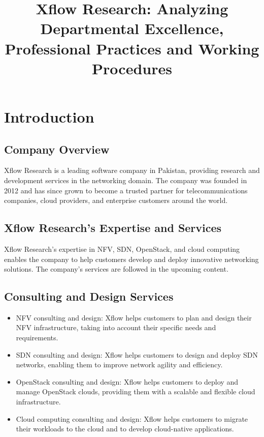 \documentclass{article}
\begin{document}
\title{Xflow Research: Analyzing Departmental Excellence, Professional Practices and Working Procedures}
\author{}
\date{}
\maketitle


\section*{Introduction}

\subsection*{Company Overview}
Xflow Research is a leading software company in Pakistan, providing research and development services in the networking domain. The company was founded in 2012 and has since grown to become a trusted partner for telecommunications companies, cloud providers, and enterprise customers around the world.
\subsection*{Xflow Research's Expertise and Services}
Xflow Research's expertise in NFV, SDN, OpenStack, and cloud computing enables the company to help customers develop and deploy innovative networking solutions. The company's services are followed in the upcoming content.

\subsection*{Consulting and Design Services}

\begin{itemize}
  \item NFV consulting and design: Xflow helps customers to plan and design their NFV infrastructure, taking into account their specific needs and requirements.
  \item SDN consulting and design: Xflow helps customers to design and deploy SDN networks, enabling them to improve network agility and efficiency.
  \item OpenStack consulting and design: Xflow helps customers to deploy and manage OpenStack clouds, providing them with a scalable and flexible cloud infrastructure.
  \item Cloud computing consulting and design: Xflow helps customers to migrate their workloads to the cloud and to develop cloud-native applications.
\end{itemize}
\end{document}
